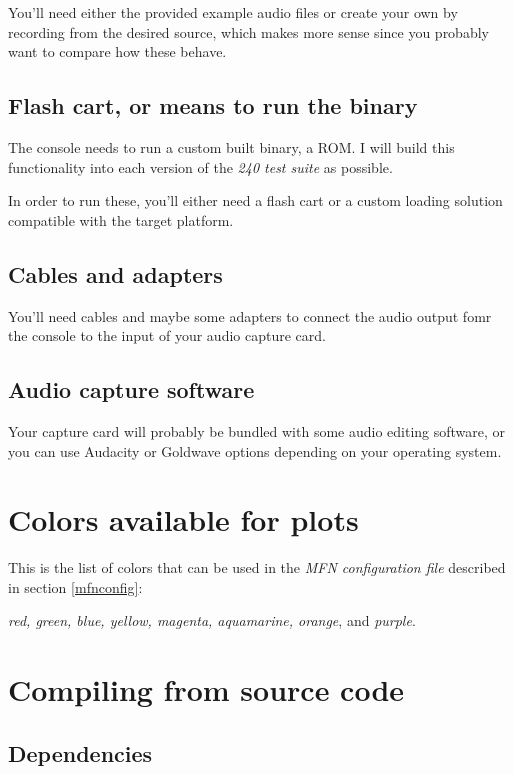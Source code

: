 \documentclass[10pt,a4paper]{report}
\begin{document}
\begin{appendices}
You'll need either the provided example audio files or create your own by recording from the desired source, which makes more sense since you probably want to compare how these behave.

\section{Flash cart, or means to run the binary}

The console needs to run a custom built binary, a ROM. I will build this functionality into each version of the \textit{240 test suite} \cite{240pSuite} as possible.

In order to run these, you'll either need a flash cart or a custom loading solution compatible with the target platform.

\section{Cables and adapters}

You'll need cables and maybe some adapters to connect the audio output fomr the console to the input of your audio capture card.

\section{Audio capture software}

Your capture card will probably be bundled with some audio editing software, or you can use  Audacity \cite{audacity} or Goldwave \cite{goldwave} options depending on your operating system.

\chapter{Colors available for plots}
\label{availablecolors}

This is the list of colors that can be used in the \textit{MFN configuration file} described in section \ref{mfnconfig}: 

\textit{red, green, blue, yellow, magenta, aquamarine, orange}, and \textit{purple}.

\chapter{Compiling from source code}

\section{Dependencies}


\end{appendices}
\end{document}
